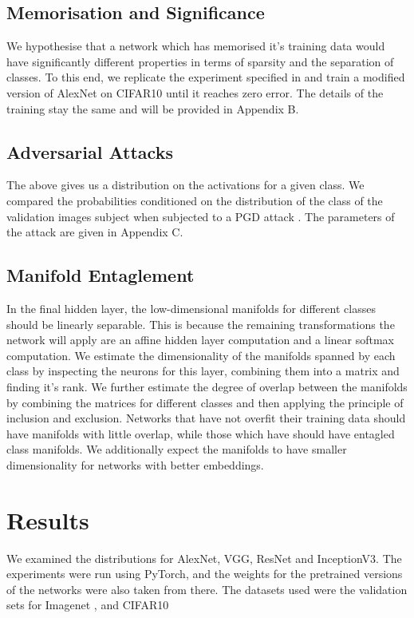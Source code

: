 \documentclass{article}
\begin{document}
        \subsection{Memorisation and Significance}
            We hypothesise that a network which has memorised it's training data would have significantly different properties in terms of sparsity and the separation of classes. To this end, we replicate the experiment specified in \cite{zhang2017understandingdeeplearningrequires} and train a modified version of AlexNet on CIFAR10 until it reaches zero error. The details of the training stay the same and will be provided in Appendix B. 
        
        \subsection{Adversarial Attacks}
            The above gives us a distribution on the activations for a given class. We compared the probabilities conditioned on the distribution of the class of the validation images subject when subjected to a PGD attack \cite{madry2019deeplearningmodelsresistant}. The parameters of the attack are given in Appendix C. 
        
        \subsection{Manifold Entaglement}
            In the final hidden layer, the low-dimensional manifolds for different classes should be linearly separable. This is because the remaining transformations the network will apply are an affine hidden layer computation and a linear softmax computation. We estimate the dimensionality of the manifolds spanned by each class by inspecting the neurons for this layer, combining them into a matrix and finding it's rank. We further estimate the degree of overlap between the manifolds by combining the matrices for different classes and then applying the principle of inclusion and exclusion. Networks that have not overfit their training data should have manifolds with little overlap, while those which have should have entagled class manifolds. We additionally expect the manifolds to have smaller dimensionality for networks with better embeddings. 

    \section{Results}
        We examined the distributions for AlexNet, VGG, ResNet and InceptionV3. The experiments were run using PyTorch, and the weights for the pretrained versions of the networks were also taken from there. The datasets used were the validation sets for Imagenet \cite{russakovsky2015imagenetlargescalevisual}, and CIFAR10 \cite{Krizhevsky2009LearningML}
\end{document}
